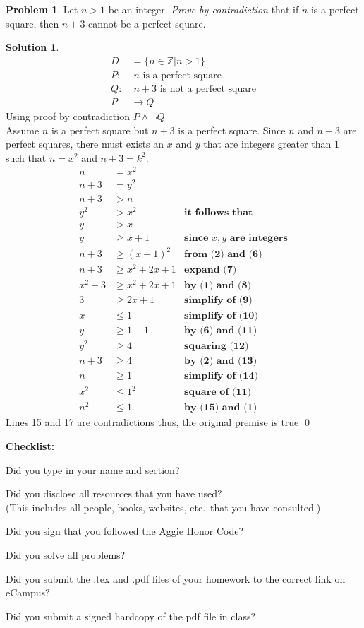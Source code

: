 \documentclass{article}
\theoremstyle{definition}
\newtheorem{problem}{Problem}
\newtheorem*{solution}{Solution}
\newcommand{\checklist}{\noindent\textbf{Checklist:}
\begin{compactitem}[$\Box$] 
\item Did you type in your name and section? 
\item Did you disclose all resources that you have used? \\
(This includes all people, books, websites, etc.\ that you have consulted.)
\item Did you sign that you followed the Aggie Honor Code? 
\item Did you solve all problems? 
\item Did you submit the .tex and .pdf files of your homework to the correct link on eCampus?
\item Did you submit a signed hardcopy of the pdf file in class? 
\end{compactitem}
}
\begin{document}
\begin{problem} Let $n>1$ be an integer. \textsl{Prove by contradiction} that 
if $n$ is a perfect square, then $n+3$ cannot be a perfect square. 
\end{problem}
\begin{solution}
\begin{align*}
  D &= \{n \in \mathbb{Z} | n > 1\} \\
  P:& \; n \text{ is a perfect square} \\
  Q:&\;  n+3 \text{ is not a perfect square} \\
  P &\rightarrow Q
\end{align*}
Using proof by contradiction $P \land \lnot Q$ \\
Assume $n$ is a perfect square but $n+3$ is a perfect square. Since $n$ and $n+3$ are perfect squares, there must exists an $x$ and $y$ that are integers greater than 1 such that $n=x^2$ and $n+3=k^2$.
\setcounter{equation}{0}
\begin{align}
  n &= x^2 \\
  n + 3 &= y^2 \\
  n+3 &> n \\
  y^2 &> x^2 & \textbf{it follows that} \\
  y &> x \\
  y &\geq x + 1 &\textbf{since $x,y$ are integers}\\
  n+3 &\geq (x+1)^2 & \textbf{from (2) and (6)} \\
  n+3 &\geq x^2 + 2x + 1 & \textbf{expand (7)} \\
  x^2 + 3 &\geq x^2 + 2x + 1 &\textbf{by (1) and (8)} \\
  3 &\geq 2x + 1 &\textbf{simplify of (9)} \\
  x &\leq 1 &\textbf{simplify of (10)} \\
  y &\geq 1 + 1 &\textbf{by (6) and (11)} \\
  y^2 &\geq 4 &\textbf{squaring (12)} \\
  n + 3 &\geq 4 &\textbf{by (2) and (13)} \\
  n &\geq 1 &\textbf{simplify of (14)} \\
  x^2 &\leq 1^2 &\textbf{square of (11)} \\
  n^2 &\leq 1 &\textbf{by (15) and (1)}
\end{align}
Lines 15 and 17 are contradictions thus, the original premise is true \qed
\end{solution}

\goodbreak
\checklist
\end{document}
